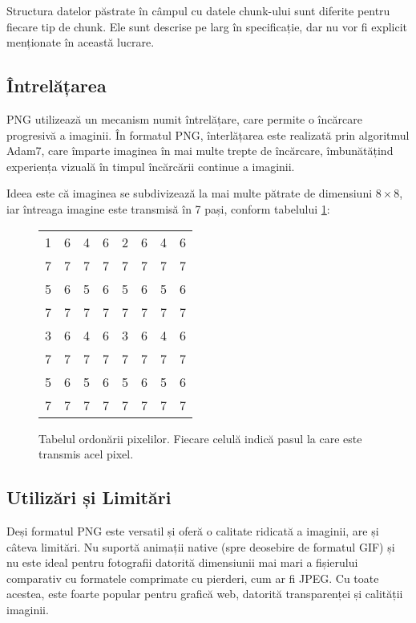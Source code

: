 \documentclass[a4paper,12pt]{report}
\begin{document}
Structura datelor păstrate în câmpul cu datele chunk-ului sunt diferite pentru fiecare tip de chunk.
Ele sunt descrise pe larg în specificație, dar nu vor fi explicit menționate în această lucrare.

\subsection{Întrelățarea}

\ac{PNG} utilizează un mecanism numit întrelățare,
care permite o încărcare progresivă a imaginii.
În formatul \ac{PNG}, înterlățarea este realizată prin algoritmul Adam7,
care împarte imaginea în mai multe trepte de încărcare,
îmbunătățind experiența vizuală în timpul încărcării continue a imaginii.

Ideea este că imaginea se subdivizează la mai multe pătrate de dimensiuni $8 \times 8$,
iar întreaga imagine este transmisă în 7 pași, conform tabelului \ref{fig:pixel_order_table}:

\begin{figure}[!ht]
\centering
\begin{tabular}{c c c c c c c c}
    1 & 6 & 4 & 6 & 2 & 6 & 4 & 6 \\
    7 & 7 & 7 & 7 & 7 & 7 & 7 & 7 \\
    5 & 6 & 5 & 6 & 5 & 6 & 5 & 6 \\
    7 & 7 & 7 & 7 & 7 & 7 & 7 & 7 \\
    3 & 6 & 4 & 6 & 3 & 6 & 4 & 6 \\
    7 & 7 & 7 & 7 & 7 & 7 & 7 & 7 \\
    5 & 6 & 5 & 6 & 5 & 6 & 5 & 6 \\
    7 & 7 & 7 & 7 & 7 & 7 & 7 & 7 \\
\end{tabular}
\caption{Tabelul ordonării pixelilor. Fiecare celulă indică pasul la care este transmis acel pixel.}
\label{fig:pixel_order_table}
\end{figure}

\subsection{Utilizări și Limitări}

Deși formatul \ac{PNG} este versatil și oferă o calitate ridicată a imaginii, are și câteva limitări.
Nu suportă animații native (spre deosebire de formatul \ac{GIF})
și nu este ideal pentru fotografii datorită dimensiunii mai mari a fișierului comparativ
cu formatele comprimate cu pierderi, cum ar fi \ac{JPEG}.
Cu toate acestea, este foarte popular pentru grafică web,
datorită transparenței și calității imaginii.
\end{document}
